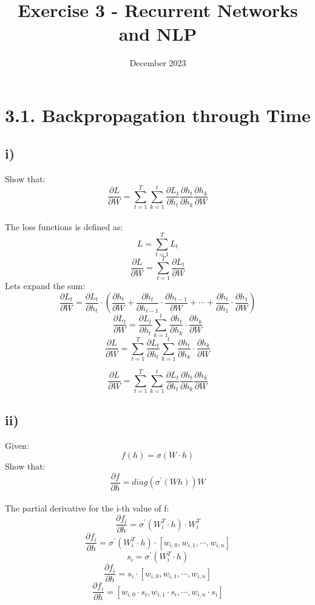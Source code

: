 

\title{Exercise 3 - Recurrent Networks and NLP}
\date{December 2023}



\maketitle
\section*{3.1. Backpropagation through Time}
\subsection*{i)}
Show that: 
\[\frac{\partial L}{\partial W} = \sum_{t=1}^{T} 
\sum_{k=1}^{t} 
\frac{\partial L_t}{\partial h_t} 
\frac{\partial h_t}{\partial h_k} 
\frac{\partial h_k}{\partial W} \]\\
The loss functions is defined as:
\[L=\sum_{t=1}^{T} L_t\]
\[\frac{\partial L}{\partial W} = \sum_{t=1}^{T}\frac{\partial L_t}{\partial W}\]
Lets expand the sum:
\[ \frac{\partial L_t}{\partial W} =
  \frac{\partial L_t}{\partial h_t} \cdot (\frac{\partial h_t}{\partial W} +
  \frac{\partial h_t}{\partial h_{t-1}} \cdot \frac{\partial h_{t-1}}{\partial W} + \cdots +
  \frac{\partial h_t}{\partial h_1} \cdot \frac{\partial h_1}{\partial W})\]
\[ \frac{\partial L_t}{\partial W} = \frac{\partial L_t}{\partial h_t} \sum_{k=1}^{t} \frac{\partial h_t}{\partial h_k} \cdot \frac{\partial h_k}{\partial W}\]
\[\frac{\partial L}{\partial W} = \sum_{t=1}^{T}\frac{\partial L_t}{\partial h_t} \sum_{k=1}^{t} \frac{\partial h_t}{\partial h_k} \cdot \frac{\partial h_k}{\partial W}\]

\[\frac{\partial L}{\partial W} = \sum_{t=1}^{T} 
\sum_{k=1}^{t} 
\frac{\partial L_t}{\partial h_t} 
\frac{\partial h_t}{\partial h_k} 
\frac{\partial h_k}{\partial W} \]
\subsection*{ii)}
Given:
\[f(h) = \sigma(W \cdot h)\]
Show that:
\[\frac{\partial f}{\partial h} = diag(\sigma^{\prime}(Wh))W\]\\
The partial derivative for the i-th value of f:
\[\frac{\partial f_i}{\partial h} = \sigma^{\prime}(W_i^T \cdot h) \cdot W_i^T\]
\[\frac{\partial f_i}{\partial h} = \sigma^{\prime}(W_i^T \cdot h) \cdot [w_{i,0},w_{i,1},\cdots,w_{i,n}]\]
\[s_i = \sigma^{\prime}(W_i^T \cdot h)\]
\[\frac{\partial f_i}{\partial h} =s_i \cdot [w_{i,0},w_{i,1},\cdots,w_{i,n}]\]
\[\frac{\partial f_i}{\partial h} = [w_{i,0} \cdot s_i,w_{i,1} \cdot s_i,\cdots,w_{i,n} \cdot s_i]\]

